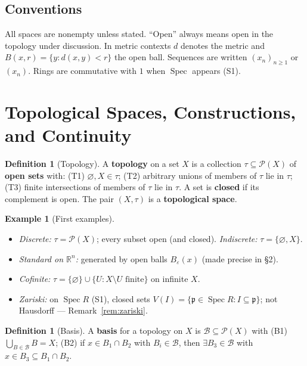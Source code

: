 \documentclass[11pt,a4paper]{article}
\theoremstyle{definition}
\newtheorem{definition}[theorem]{Definition}
\newtheorem{example}[theorem]{Example}
\newcommand{\R}{\mathbb{R}}
\newcommand{\Pow}{\mathcal{P}}
\newcommand{\Spec}{\operatorname{Spec}}
\newcommand{\p}{\mathfrak{p}}
\begin{document}
	\subsection*{Conventions}
	All spaces are nonempty unless stated. ``Open'' always means open in the topology under discussion.
	In metric contexts $d$ denotes the metric and $B(x,r)=\{y:d(x,y)<r\}$ the open ball. Sequences are
	written $(x_n)_{n\ge1}$ or $(x_n)$. Rings are commutative with $1$ when $\Spec$ appears (S1).
	
	\tableofcontents
	\newpage
	
	\section{Topological Spaces, Constructions, and Continuity}
	
	\begin{definition}[Topology]
		A \textbf{topology} on a set $X$ is a collection $\tau\subseteq\Pow(X)$ of \textbf{open sets} with:
		(T1) $\varnothing,X\in\tau$; (T2) arbitrary unions of members of $\tau$ lie in $\tau$;
		(T3) finite intersections of members of $\tau$ lie in $\tau$. A set is \textbf{closed} if its
		complement is open. The pair $(X,\tau)$ is a \textbf{topological space}.
	\end{definition}
	
	\begin{example}[First examples]\label{ex:topologies}
		\begin{itemize}
			\item \emph{Discrete:} $\tau=\Pow(X)$; every subset open (and closed). \emph{Indiscrete:} $\tau=\{\varnothing,X\}$.
			\item \emph{Standard on $\R^n$:} generated by open balls $B_\varepsilon(x)$ (made precise in \S2).
			\item \emph{Cofinite:} $\tau=\{\varnothing\}\cup\{U:X\setminus U\text{ finite}\}$ on infinite $X$.
			\item \emph{Zariski:} on $\Spec R$ (S1), closed sets $V(I)=\{\p\in\Spec R:I\subseteq\p\}$; not Hausdorff --- Remark~\ref{rem:zariski}.
		\end{itemize}
	\end{example}
	
	\begin{definition}[Basis]
		A \textbf{basis} for a topology on $X$ is $\mathcal B\subseteq\Pow(X)$ with (B1) $\bigcup_{B\in\mathcal B}B=X$;
		(B2) if $x\in B_1\cap B_2$ with $B_i\in\mathcal B$, then $\exists B_3\in\mathcal B$ with $x\in B_3\subseteq B_1\cap B_2$.
	\end{definition}
	
\end{document}
